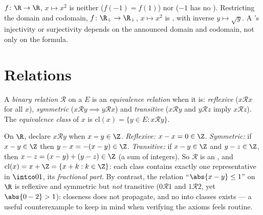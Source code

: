 \begin{example}\label{ex:b1:logic:injexamples}
$f \colon \R \to \R$, $x \mapsto x^2$ is neither  ($f(-1) =
f(1)$) nor  ($-1$ has no ). Restricting the domain
and codomain, $f \colon \R_+ \to \R_+$, $x \mapsto x^2$ is ,
with inverse $y \mapsto \sqrt y$. A 's injectivity or surjectivity
depends on the announced domain and codomain, not only on the formula.
\end{example}

\section{Relations}

\begin{definition}\label{def:b1:logic:equiv}
A \emph{binary relation} $\mathcal{R}$ on a  $E$ is an
\emph{equivalence relation} when it is:
\emph{reflexive} ($x \mathbin{\mathcal{R}} x$ for all $x$),
\emph{symmetric} ($x \mathbin{\mathcal{R}} y \implies y
\mathbin{\mathcal{R}} x$) and \emph{transitive} ($x
\mathbin{\mathcal{R}} y$ and $y \mathbin{\mathcal{R}} z$ imply $x
\mathbin{\mathcal{R}} z$). The \emph{equivalence class} of $x$ is
$\mathrm{cl}(x) = \{y \in E : x \mathbin{\mathcal{R}} y\}$.
\end{definition}

\begin{example}\label{ex:b1:logic:fracpart}
On $\R$, declare $x \mathbin{\mathcal{R}} y$ when $x - y \in \Z$.
\emph{Reflexive:} $x - x = 0 \in \Z$. \emph{Symmetric:} if $x - y
\in \Z$ then $y - x = -(x - y) \in \Z$. \emph{Transitive:} if $x -
y \in \Z$ and $y - z \in \Z$, then $x - z = (x - y) + (y - z) \in
\Z$ (a sum of integers). So $\mathcal R$ is an , and $\mathrm{cl}(x) = x + \Z = \{x + k : k \in \Z\}$:
each class contains exactly one representative in $\intco01$, its
\emph{fractional part}. By contrast, the relation ``$\abs{x - y}
\leq 1$'' on $\R$ is reflexive and symmetric but \emph{not}
transitive ($0 \mathbin{\mathcal R} 1$ and $1 \mathbin{\mathcal R}
2$, yet $\abs{0 - 2} > 1$): closeness does not propagate, and no
 into classes exists --- a useful counterexample to keep
in mind when verifying the axioms feels routine.
\end{example}

